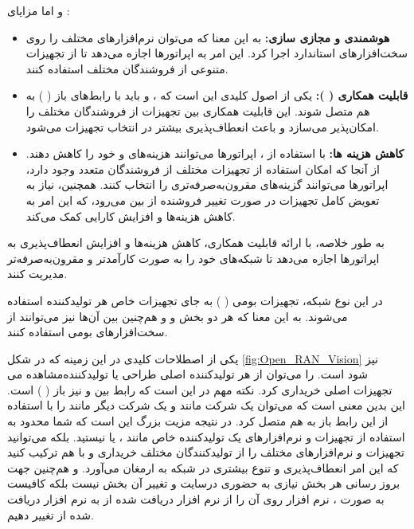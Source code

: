 \documentclass[landscape, 12pt]{report}
\begin{document}
	و اما مزایای 
	:
\begin{itemize}
\item \textbf{هوشمندی و مجازی سازی:}
به این معنا که می‌توان نرم‌افزارهای مختلف را روی سخت‌افزارهای استاندارد اجرا کرد. این امر به اپراتورها اجازه می‌دهد تا از تجهیزات متنوعی از فروشندگان مختلف استفاده کنند.
\item 
\textbf{قابلیت همکاری (
): }
یکی از اصول کلیدی 
 این است که
  ،
    و
      باید با رابط‌های باز
       (
       ) به هم متصل شوند. این قابلیت همکاری بین تجهیزات از فروشندگان مختلف را امکان‌پذیر می‌سازد و باعث انعطاف‌پذیری بیشتر در انتخاب تجهیزات می‌شود.


\item \textbf{کاهش هزینه ها:} 
با استفاده از 
، اپراتورها می‌توانند هزینه‌های
  و
    خود را کاهش دهند. از آنجا که امکان استفاده از تجهیزات مختلف از فروشندگان متعدد وجود دارد، اپراتورها می‌توانند گزینه‌های مقرون‌به‌صرفه‌تری را انتخاب کنند. همچنین، نیاز به تعویض کامل تجهیزات در صورت تغییر فروشنده از بین می‌رود، که این امر به کاهش هزینه‌ها و افزایش کارایی کمک می‌کند.

\end{itemize}
	به طور خلاصه،
	 با ارائه قابلیت همکاری، کاهش هزینه‌ها و افزایش انعطاف‌پذیری به اپراتورها اجازه می‌دهد تا شبکه‌های خود را به صورت کارآمدتر و مقرون‌به‌صرفه‌تر مدیریت کنند.
	
	در این نوع شبکه، تجهیزات بومی (
	) به جای تجهیزات خاص هر تولیدکننده استفاده می‌شوند. به این معنا که هر دو بخش
 و
    و هم‌چنین
     بین آن‌ها نیز می‌توانند از سخت‌افزارهای بومی استفاده کنند.
	
	یکی از اصطلاحات کلیدی در این زمینه که در شکل \ref{fig:Open_RAN_Vision} نیز مشاهده می‎‌شود
	   است.
	     را می‌توان از هر تولیدکننده اصلی طراحی
	       یا تولیدکننده تجهیزات اصلی 
	 خریداری کرد. نکته مهم در 
	 این است که رابط بین
	   و
	     نیز باز (
	      ) است. این 
	بدین معنی است که می‌توان
	 یک شرکت مانند
	   و
	     یک شرکت دیگر مانند
	        را با استفاده از این رابط باز به هم متصل کرد. در نتیجه مزیت بزرگ 
	         این است که شما محدود به استفاده از تجهیزات و نرم‌افزارهای یک تولیدکننده خاص مانند
	          ، 
	          یا
	          نیستید. بلکه می‌توانید تجهیزات و نرم‌افزارهای مختلف را از تولیدکنندگان مختلف خریداری و با هم ترکیب کنید که این امر انعطاف‌پذیری و تنوع بیشتری در شبکه به ارمغان می‌آورد. و هم‌چنین جهت بروز رسانی هر بخش نیازی به حضوری درسایت و تغییر
	            آن بخش نیست بلکه کافیست به صورت
	              ، نرم افزار روی آن را از نرم افزار دریافت شده از
	                 به نرم افزار دریافت شده از
	                    تغییر دهیم.
	
\end{document}

